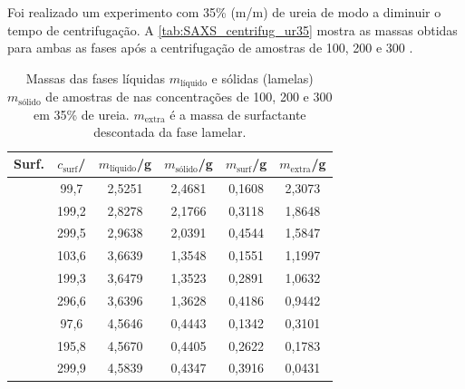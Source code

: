 	Foi realizado um experimento com 35\% (m/m) de ureia de modo a diminuir o tempo de centrifugação. A \autoref{tab:SAXS_centrifug_ur35} mostra as massas obtidas para ambas as fases após a centrifugação de amostras de \CTDTAB{} 100, 200 e 300 \mM{}.
	
	\begin{table}[h]
		\IBGEtab%
		{
			\caption{Massas das fases líquidas \(m_{\text{líquido}}\) e sólidas (lamelas) \(m_{\text{sólido}}\) de amostras de \CTDTAB{} nas concentrações de 100, 200 e 300 \mM{} em 35\% de ureia. \(m_{\text{extra}}\) é a massa de surfactante descontada da fase lamelar.}
			
			\label{tab:SAXS_centrifug_ur35}
		}
		{
			\begin{tabular}{c c | c c c c}
				\toprule
				        Surf.         & \(c_{\text{surf}}\)/\mM & \(m_{\text{líquido}}\)/g & \(m_{\text{sólido}}\)/g & \(m_{\text{surf}}\)/g & \(m_{\text{extra}}\)/g \\ \midrule
				\multirow{3}{*}{\CTAB} & 99,7                  & 2,5251                 & 2,4681                & 0,1608              & 2,3073               \\
				                      & 199,2                 & 2,8278                 & 2,1766                & 0,3118              & 1,8648               \\
				                      & 299,5                 & 2,9638                 & 2,0391                & 0,4544              & 1,5847               \\ \midrule
				\multirow{3}{*}{\TTAB} & 103,6                 & 3,6639                 & 1,3548                & 0,1551              & 1,1997               \\
				                      & 199,3                 & 3,6479                 & 1,3523                & 0,2891              & 1,0632               \\
				                      & 296,6                 & 3,6396                 & 1,3628                & 0,4186              & 0,9442               \\ \midrule
				\multirow{3}{*}{\DTAB} & 97,6                  & 4,5646                 & 0,4443                & 0,1342              & 0,3101               \\
				                      & 195,8                 & 4,5670                 & 0,4405                & 0,2622              & 0,1783               \\
				                      & 299,9                 & 4,5839                 & 0,4347                & 0,3916              & 0,0431               \\ \bottomrule
			\end{tabular}
		}
		{}
	\end{table}
	
